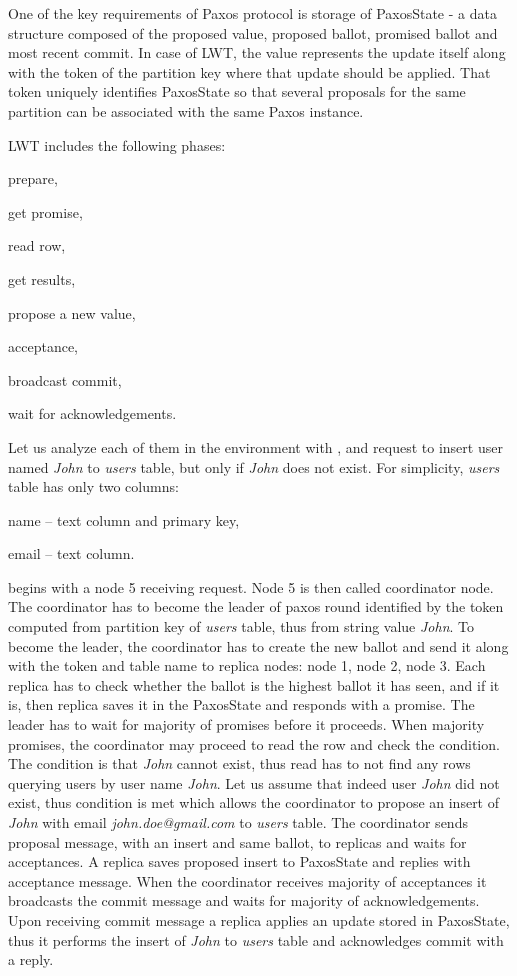 One of the key requirements of Paxos protocol is storage of PaxosState - a data structure composed of the proposed value, proposed ballot, promised ballot and most recent commit. In case of LWT, the value represents the update itself along with the token of the partition key where that update should be applied. That token uniquely identifies PaxosState so that several proposals for the same partition can be associated with the same Paxos instance. 


LWT includes the following phases: \begin{enumerate*}[label=\alph*)]
\item prepare,
\item get promise,
\item read row,
\item get results,
\item propose a new value,
\item acceptance,
\item broadcast commit,
\item wait for acknowledgements.
\end{enumerate*} 

Let us analyze each of them in the environment with ,  and request to insert user named \emph{John} to \emph{users} table, but only if \emph{John} does not exist. For simplicity, \emph{users} table has only two columns: \begin{enumerate*}[label=\alph*)]
\item name -- text column and primary key, \item email -- text column. \end{enumerate*} \lwt begins with a node 5 receiving request. Node 5 is then called coordinator node. The coordinator has to become the leader of paxos round identified by the token computed from partition key of \emph{users} table, thus from string value \emph{John}. To become the leader, the coordinator has to create the new ballot and send it along with the token and table name to replica nodes: node 1, node 2, node 3. Each replica has to check whether the ballot is the highest ballot it has seen, and if it is, then replica saves it in the PaxosState and responds with a promise. The leader has to wait for majority of promises before it proceeds. When majority promises, the coordinator may proceed to read the row and check the condition. The condition is that \emph{John} cannot exist, thus read has to not find any rows querying users by user name \emph{John}. Let us assume that indeed user \emph{John} did not exist, thus condition is met which allows the coordinator to propose an insert of \emph{John} with email \emph{john.doe@gmail.com} to \emph{users} table. The coordinator sends proposal message, with an insert and same ballot, to replicas and waits for acceptances. A replica saves proposed insert to PaxosState and replies with acceptance message.
When the coordinator receives majority of acceptances it broadcasts the commit message and waits for majority of acknowledgements. Upon receiving commit message a replica applies an update stored in PaxosState, thus it performs the insert of \emph{John} to \emph{users} table and acknowledges commit with a reply.

